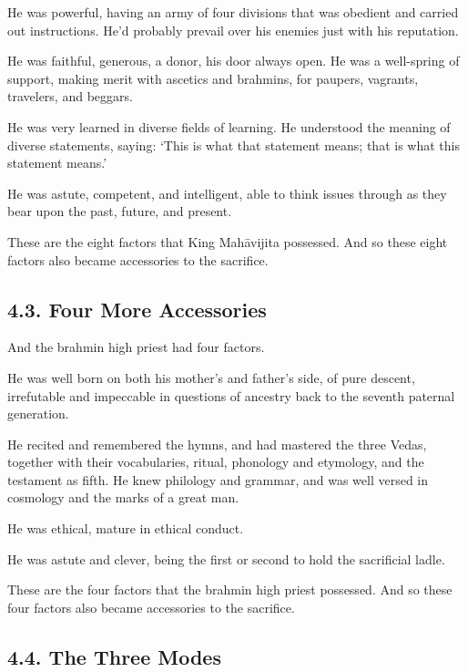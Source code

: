 \documentclass[12pt,openany]{book}%
\begin{document}
He was powerful, having an army of four divisions that was obedient and carried out instructions. He’d probably prevail over his enemies just with his reputation. 

He was faithful, generous, a donor, his door always open. He was a well-spring of support, making merit with ascetics and brahmins, for paupers, vagrants, travelers, and beggars. 

He was very learned in diverse fields of learning. He understood the meaning of diverse statements, saying: ‘This is what that statement means; that is what this statement means.’ 

He was astute, competent, and intelligent, able to think issues through as they bear upon the past, future, and present. 

These are the eight factors that King \textsanskrit{Mahāvijita} possessed. And so these eight factors also became accessories to the sacrifice. 

\subsection*{4.3. Four More Accessories }

And the brahmin high priest had four factors. 

He was well born on both his mother’s and father’s side, of pure descent, irrefutable and impeccable in questions of ancestry back to the seventh paternal generation. 

He recited and remembered the hymns, and had mastered the three Vedas, together with their vocabularies, ritual, phonology and etymology, and the testament as fifth. He knew philology and grammar, and was well versed in cosmology and the marks of a great man. 

He was ethical, mature in ethical conduct. 

He was astute and clever, being the first or second to hold the sacrificial ladle. 

These are the four factors that the brahmin high priest possessed. And so these four factors also became accessories to the sacrifice. 

\subsection*{4.4. The Three Modes }
\end{document}
